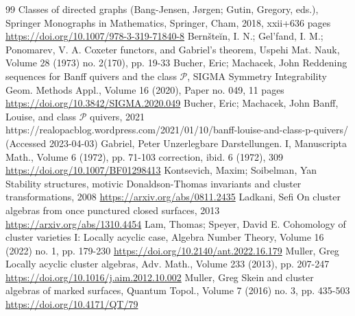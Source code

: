 \documentclass[10pt]{amsart}
\theoremstyle{definition}
\theoremstyle{remark}
\begin{document}
\begin{thebibliography}{99}
 Classes of directed graphs (Bang-Jensen, Jørgen; Gutin, Gregory, eds.), Springer Monographs in Mathematics, Springer, Cham, 2018, xxii+636 pages \url{https://doi.org/10.1007/978-3-319-71840-8}
 Bernšteĭn, I. N.; Gel’fand, I. M.; Ponomarev, V. A. Coxeter functors, and Gabriel’s theorem, Uspehi Mat. Nauk, Volume 28 (1973) no. 2(170), pp. 19-33
 Bucher, Eric; Machacek, John Reddening sequences for Banff quivers and the class ${\mathcal{P}}$, SIGMA Symmetry Integrability Geom. Methods Appl., Volume 16 (2020), Paper no. 049, 11 pages \url{https://doi.org/10.3842/SIGMA.2020.049}
 Bucher, Eric; Machacek, John Banff, Louise, and class ${\mathcal{P}}$ quivers, 2021 https://realopacblog.wordpress.com/2021/01/10/banff-louise-and-class-p-quivers/ (Accessed 2023-04-03)
 Gabriel, Peter Unzerlegbare Darstellungen. I, Manuscripta Math., Volume 6 (1972), pp. 71-103 correction, ibid. 6 (1972), 309 \url{https://doi.org/10.1007/BF01298413}
 Kontsevich, Maxim; Soibelman, Yan Stability structures, motivic Donaldson-Thomas invariants and cluster transformations, 2008 \url{https://arxiv.org/abs/0811.2435}
 Ladkani, Sefi On cluster algebras from once punctured closed surfaces, 2013 \url{https://arxiv.org/abs/1310.4454}
 Lam, Thomas; Speyer, David E. Cohomology of cluster varieties I: Locally acyclic case, Algebra Number Theory, Volume 16 (2022) no. 1, pp. 179-230 \url{https://doi.org/10.2140/ant.2022.16.179}
 Muller, Greg Locally acyclic cluster algebras, Adv. Math., Volume 233 (2013), pp. 207-247 \url{https://doi.org/10.1016/j.aim.2012.10.002}
 Muller, Greg Skein and cluster algebras of marked surfaces, Quantum Topol., Volume 7 (2016) no. 3, pp. 435-503 \url{https://doi.org/10.4171/QT/79}
\end{thebibliography}
\end{document}
